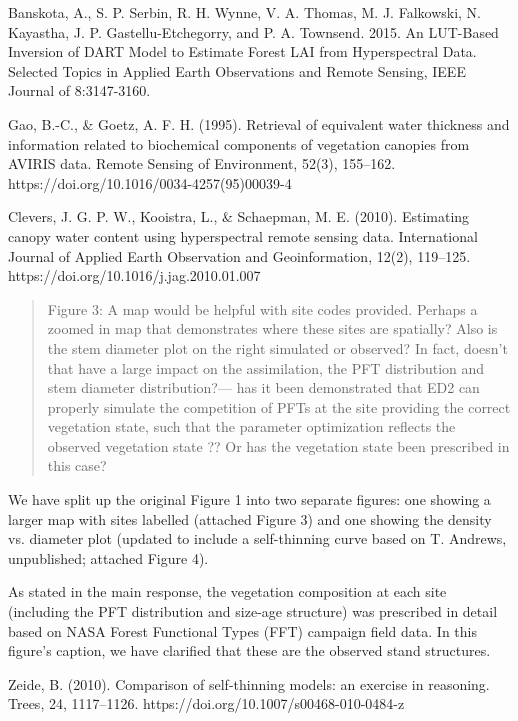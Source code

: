 \medskip
\noindent Banskota, A., S. P. Serbin, R. H. Wynne, V. A. Thomas, M. J. Falkowski, N. Kayastha, J. P. Gastellu-Etchegorry, and P. A. Townsend. 2015. An LUT-Based Inversion of DART Model to Estimate Forest LAI from Hyperspectral Data. Selected Topics in Applied Earth Observations and Remote Sensing, IEEE Journal of 8:3147-3160.

\medskip
\noindent Gao, B.-C., \& Goetz, A. F. H. (1995). Retrieval of equivalent water thickness and information related to biochemical components of vegetation canopies from AVIRIS data. Remote Sensing of Environment, 52(3), 155–162. https://doi.org/10.1016/0034-4257(95)00039-4

\medskip
\noindent Clevers, J. G. P. W., Kooistra, L., \& Schaepman, M. E. (2010). Estimating canopy water content using hyperspectral remote sensing data. International Journal of Applied Earth Observation and Geoinformation, 12(2), 119–125. https://doi.org/10.1016/j.jag.2010.01.007

\begin{quote}
  Figure 3: A map would be helpful with site codes provided. Perhaps a zoomed in map that demonstrates where these sites are spatially? Also is the stem diameter plot on the right simulated or observed? In fact, doesn’t that have a large impact on the assimilation, the PFT distribution and stem diameter distribution?— has it been demonstrated that ED2 can properly simulate the competition of PFTs at the site providing the correct vegetation state, such that the parameter optimization reflects the observed vegetation state ?? Or has the vegetation state been prescribed in this case?
\end{quote}

We have split up the original Figure 1 into two separate figures: one showing a larger map with sites labelled (attached Figure 3) and one showing the density vs. diameter plot (updated to include a self-thinning curve based on T. Andrews, unpublished; attached Figure 4).

As stated in the main response, the vegetation composition at each site (including the PFT distribution and size-age structure) was prescribed in detail based on NASA Forest Functional Types (FFT) campaign field data. In this figure’s caption, we have clarified that these are the  observed stand structures.

\medskip
\noindent Zeide, B. (2010). Comparison of self-thinning models: an exercise in reasoning. Trees, 24, 1117–1126. https://doi.org/10.1007/s00468-010-0484-z

